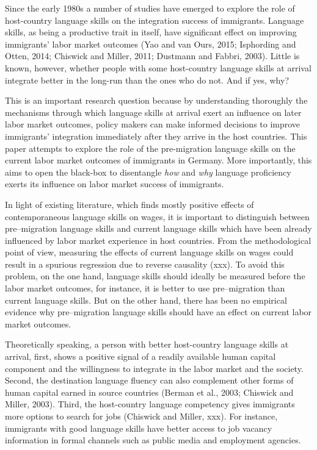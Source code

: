 \documentclass[12pt,a4paper]{article}
\begin{document}
Since the early 1980s a number of studies have emerged to explore the role of host-country language skills on the integration success of immigrants. Language skills, as being a productive trait in itself, have significant effect on improving immigrants' labor market outcomes (Yao and van Ours, 2015; Isphording and Otten, 2014; Chiswick and Miller, 2011; Dustmann and Fabbri, 2003). Little is known, however, whether people with some host-country language skills at arrival integrate better in the long-run than the ones who do not. And if yes, why? 

This is an important research question because by understanding thoroughly the mechanisms through which language skills at arrival exert an influence on later labor market outcomes, policy makers can make informed decisions to improve immigrants' integration immediately after they arrive in the host countries. This paper attempts to explore the role of the pre-migration language skills on the current labor market outcomes of immigrants in Germany. More importantly, this aims to open the black-box to disentangle \textit{how} and \textit{why} language proficiency exerts its influence on labor market success of immigrants.

In light of existing literature, which finds mostly positive effects of contemporaneous language skills on wages, it is important to distinguish between pre--migration language skills and current language skills which have been already influenced by labor market experience in host countries. From the methodological point of view, measuring the effects of current language skills on wages could result in a spurious regression due to reverse causality (xxx). To avoid this problem, on the one hand, language skills should ideally be measured before the labor market outcomes, for instance, it is better to use pre--migration than current language skills. But on the other hand, there has been no empirical evidence why pre--migration language skills should have an effect on current labor market outcomes.

Theoretically speaking, a person with better host-country language skills at arrival, first, shows a positive signal of a readily available human capital component and the willingness to integrate in the labor market and the society. Second, the destination language fluency can also complement other forms of human capital earned in source countries (Berman et al., 2003; Chiswick and Miller, 2003). Third, the host-country language competency gives immigrants more options to search for jobs (Chiswick and Miller, xxx). For instance, immigrants with good language skills have better access to job vacancy information in formal channels such as public media and employment agencies. 
\end{document}
